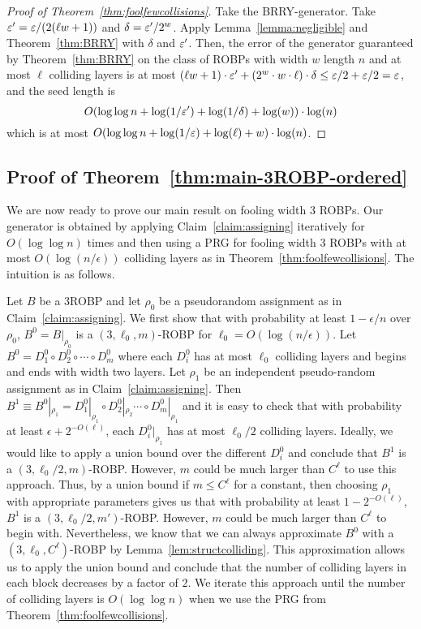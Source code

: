 \begin{proof}[Proof of Theorem~\ref{thm:foolfewcollisions}]
	Take the BRRY-generator. %
	Take $\varepsilon' = \varepsilon/(2(\ell w+1))$ and $\delta = \varepsilon'/2^{w}$. 
	Apply Lemma~\ref{lemma:negligible} and Theorem~\ref{thm:BRRY} with $\delta$ and $\varepsilon'$.
	Then, the error of the generator guaranteed by Theorem~\ref{thm:BRRY}  on the class of ROBPs with width $w$ length $n$ and at most $\ell$ colliding layers is at most 
	$(\ell w+1) \cdot \varepsilon' + (2^{w} \cdot w\cdot \ell) \cdot \delta \le \varepsilon/2 + \varepsilon/2 = \varepsilon$, 
	and the seed length is 
	$$O(\log \log n + \log(1/\varepsilon') + \log(1/\delta) + \log(w)) \cdot \log(n)$$
	which is at most $O(\log \log n + \log(1/\varepsilon) + \log(\ell) + w)\cdot \log(n)$.
	\end{proof}
	
\subsection{Proof of Theorem~\ref{thm:main-3ROBP-ordered}}
We are now ready to prove our main result on fooling width 3 ROBPs. Our generator is obtained by applying Claim~\ref{claim:assigning} iteratively for $O(\log \log n)$ times and then using a PRG for fooling width 3 ROBPs with at most $O(\log(n/\epsilon))$ colliding layers as in Theorem~\ref{thm:foolfewcollisions}. The intuition is as follows. 

Let $B$ be a 3ROBP and let $\rho_0$ be a pseudorandom assignment as in Claim~\ref{claim:assigning}. We first show that with probability at least $1-\epsilon/n$ over $\rho_0$,  $B^0 = B|_{\rho_0}$ is a $(3,\ell_0,m)$-ROBP for $\ell_0 = O(\log(n/\epsilon))$. Let $B^0 = D_1^0 \circ D_2^0 \circ \cdots \circ D_m^0$ where each $D_i^0$ has at most $\ell_0$ colliding layers and begins and ends with width two layers. Let $\rho_1$ be an independent pseudo-random assignment as in Claim~\ref{claim:assigning}. Then $B^1 \equiv B^0|_{\rho_1} = D_1^0|_{\rho_1} \circ D_2^0|_{\rho_2} \cdots \circ D_m^0|_{\rho_1}$ and it is easy to check that with probability at least $\epsilon + 2^{-O(\ell)}$, each $D_i^0|_{\rho_1}$ has at most $\ell_0/2$ colliding layers. Ideally, we would like to apply a union bound over the different $D_i^0$ and conclude that $B^1$ is a $(3,\ell_0/2,m)$-ROBP. However, $m$ could be much larger than $C^\ell$ to use this approach. Thus, by a union bound if $m \leq C^\ell$ for a constant, then choosing $\rho_1$ with appropriate parameters gives us that with probability at least $1 - 2^{-O(\ell)}$, $B^1$ is a $(3,\ell_0/2,m')$-ROBP. However, $m$ could be much larger than $C^\ell$ to begin with. Nevertheless, we know that we can always approximate $B^0$ with a $(3,\ell_0,C^\ell)$-ROBP by Lemma~\ref{lem:structcolliding}. This approximation allows us to apply the union bound and conclude that the number of colliding layers in each block decreases by a factor of $2$. We iterate this approach until the number of colliding layers is $O(\log \log n)$ when we use the PRG from Theorem~\ref{thm:foolfewcollisions}.

